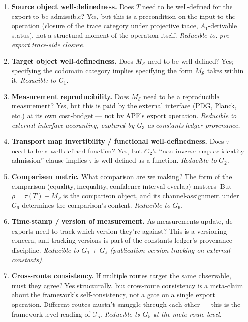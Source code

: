 \begin{enumerate}
\item \textbf{Source object well-definedness.} Does $T$ need to be well-defined for the export to be admissible? Yes, but this is a precondition on the input to the operation (closure of the trace category under projective trace, $A_1$-derivable status), not a structural moment of the operation itself. \emph{Reducible to: pre-export trace-side closure.}

\item \textbf{Target object well-definedness.} Does $M_{\mathcal{S}}$ need to be well-defined? Yes; specifying the codomain category implies specifying the form $M_{\mathcal{S}}$ takes within it. \emph{Reducible to $G_1$.}

\item \textbf{Measurement reproducibility.} Does $M_{\mathcal{S}}$ need to be a reproducible measurement? Yes, but this is paid by the external interface (PDG, Planck, etc.) at its own cost-budget --- not by APF's export operation. \emph{Reducible to external-interface accounting, captured by $G_3$ as constants-ledger provenance.}

\item \textbf{Transport map invertibility / functional well-definedness.} Does $\tau$ need to be a well-defined function? Yes, but $G_2$'s ``non-inverse map or identity admission'' clause implies $\tau$ is well-defined as a function. \emph{Reducible to $G_2$.}

\item \textbf{Comparison metric.} What comparison are we making? The form of the comparison (equality, inequality, confidence-interval overlap) matters. But $\rho = \tau(T) - M_{\mathcal{S}}$ is the comparison object, and its channel-assignment under $G_6$ determines the comparison's content. \emph{Reducible to $G_6$.}

\item \textbf{Time-stamp / version of measurement.} As measurements update, do exports need to track which version they're against? This is a versioning concern, and tracking versions is part of the constants ledger's provenance discipline. \emph{Reducible to $G_3$ + $G_4$ (publication-version tracking on external constants).}

\item \textbf{Cross-route consistency.} If multiple routes target the same observable, must they agree? Yes structurally, but cross-route consistency is a meta-claim about the framework's self-consistency, not a gate on a single export operation. Different routes mustn't smuggle through each other --- this is the framework-level reading of $G_5$. \emph{Reducible to $G_5$ at the meta-route level.}


\end{enumerate}
